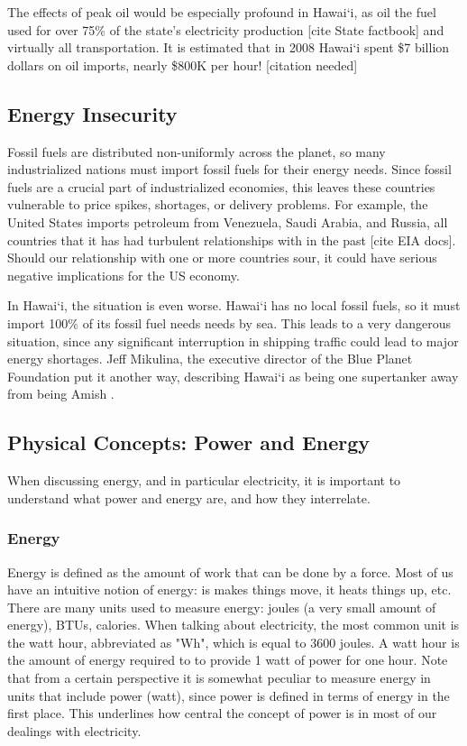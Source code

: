 The effects of peak oil would be especially profound in Hawai`i, as oil the fuel used for over 75\% of the state's electricity production [cite State factbook] and virtually all transportation. It is estimated that in 2008 Hawai`i spent \$7 billion dollars on oil imports, nearly \$800K per hour! [citation needed]

\subsection{Energy Insecurity}

Fossil fuels are distributed non-uniformly across the planet, so many industrialized nations must import fossil fuels for their energy needs. Since fossil fuels are a crucial part of industrialized economies, this leaves these countries vulnerable to price spikes, shortages, or delivery problems. For example, the United States imports petroleum from Venezuela, Saudi Arabia, and Russia, all countries that it has had turbulent relationships with in the past [cite EIA docs]. Should our relationship with one or more countries sour, it could have serious negative implications for the US economy.

In Hawai`i, the situation is even worse. Hawai`i has no local fossil fuels, so it must import 100\% of its fossil fuel needs needs by sea. This leads to a very dangerous situation, since any significant interruption in shipping traffic could lead to major energy shortages. Jeff Mikulina, the executive director of the Blue Planet Foundation put it another way, describing Hawai`i as being one supertanker away from being Amish \cite{nyt2008HawaiiMoonShot}.

\subsection{Physical Concepts: Power and Energy}

When discussing energy, and in particular electricity, it is important to understand what power and energy are, and how they interrelate.

\subsubsection{Energy}

Energy is defined as the amount of work that can be done by a force. Most of us have an intuitive notion of energy: is makes things move, it heats things up, etc. There are many units used to measure energy: joules (a very small amount of energy), BTUs, calories. When talking about electricity, the most common unit is the watt hour, abbreviated as "Wh", which is equal to 3600 joules. A watt hour is the amount of energy required to to provide 1 watt of power for one hour. Note that from a certain perspective it is somewhat peculiar to measure energy in units that include power (watt), since power is defined in terms of energy in the first place. This underlines how central the concept of power is in most of our dealings with electricity.

